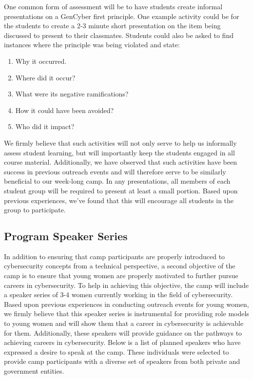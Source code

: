 \documentclass[12pt]{article}
\begin{document}
One common form of assessment will be to have students create informal presentations on a GenCyber first principle. One example activity could be for the students to create a 2-3 minute short presentation on the item being discussed to present to their classmates. Students could also be asked to find instances where the principle was being violated and state: 

	\begin{enumerate}[noitemsep]
        \item Why it occurred. 
        \item Where did it occur?
        \item What were its negative ramifications?
        \item How it could have been avoided?
        \item Who did it impact?
	\end{enumerate}

We firmly believe that such activities will not only serve to help us informally assess student learning, but will importantly keep the students engaged in all course material. Additionally, we have observed that such activities have been success in previous outreach events and will therefore serve to be similarly beneficial to our week-long camp. In any presentations, all members of each student group will be required to present at least a small portion. Based upon previous experiences, we've found that this will encourage all students in the group to participate.





\subsection{Program Speaker Series}
\label{sec: Speakers}

In addition to ensuring that camp participants are properly introduced to cybersecurity concepts from a technical perspective, a second objective of the camp is to ensure that young women are properly motivated to further pursue careers in cybersecurity. To help in achieving this objective, the camp will include a speaker series of 3-4 women currently working in the field of cybersecurity. Based upon previous experiences in conducting outreach events for young women, we firmly believe that this speaker series is instrumental for providing role models to young women and will show them that a career in cybersecurity is achievable for them. Additionally, these speakers will provide guidance on the pathways to achieving careers in cybersecurity. Below is a list of planned speakers who have expressed a desire to speak at the camp. These individuals were selected to provide camp participants with a diverse set of speakers from both private and government entities. 
\end{document}
